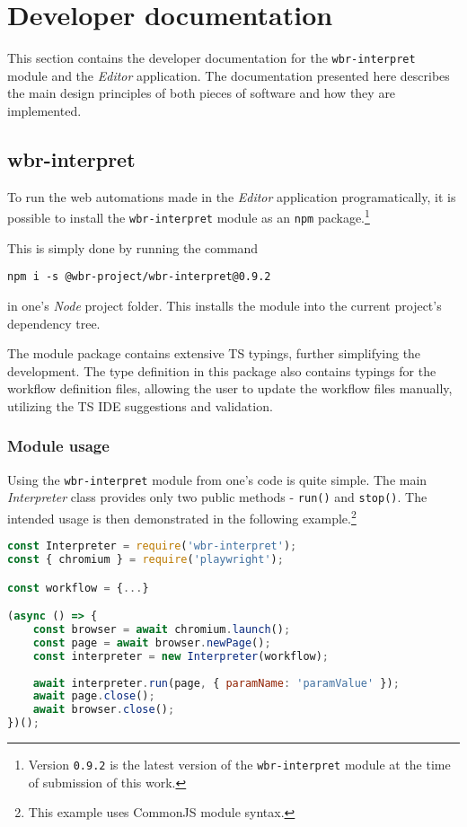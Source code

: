\clearpage
\section{Developer documentation} \label{devDocs}

This section contains the developer documentation for the \texttt{wbr-interpret} module and the \textit{Editor} application.
The documentation presented here describes the main design principles of both pieces of software and how they are implemented.

\subsection{wbr-interpret}

To run the web automations made in the \textit{Editor} application programatically, 
it is possible to install the \texttt{wbr-interpret} module as an \texttt{npm} package.\footnote{Version \texttt{0.9.2} is the latest version of the \texttt{wbr-interpret} module at the time of submission of this work.}

This is simply done by running the command
\begin{center}
\verb|npm i -s @wbr-project/wbr-interpret@0.9.2|
\end{center}
in one's \textit{Node} project folder. 
This installs the module into the current project's dependency tree.

The module package contains extensive \acs{TS} typings, further simplifying the development.
The type definition in this package also contains typings for the workflow definition files, allowing the user to update the workflow files manually, 
utilizing the \acl{TS} \acs{IDE} suggestions and validation.

\subsubsection{Module usage}

Using the \texttt{wbr-interpret} module from one's code is quite simple.
The main \textit{Interpreter} class provides only two public methods - \texttt{run()} and \texttt{stop()}.
The intended usage is then demonstrated in the following example.\footnote{This example uses CommonJS module syntax.}

\begin{lstlisting}[language=javascript]
const Interpreter = require('wbr-interpret');
const { chromium } = require('playwright');

const workflow = {...}

(async () => {
    const browser = await chromium.launch();
    const page = await browser.newPage();
    const interpreter = new Interpreter(workflow);
    
    await interpreter.run(page, { paramName: 'paramValue' });
    await page.close();
    await browser.close();
})();
\end{lstlisting}

